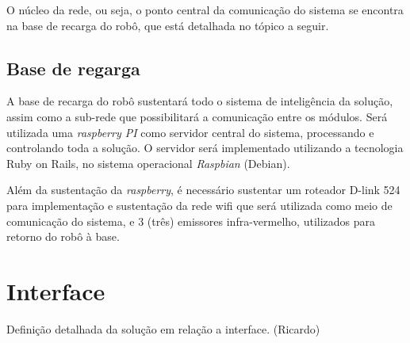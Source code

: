 	O núcleo da rede, ou seja, o ponto central da comunicação do sistema se encontra na base de recarga do robô, que está detalhada no tópico a seguir.

	\subsection{Base de regarga}

	A base de recarga do robô sustentará todo o sistema de inteligência da solução, assim como a sub-rede que possibilitará a comunicação entre os módulos. Será utilizada uma \textit{raspberry PI} como servidor central do sistema, processando e controlando toda a solução. O servidor será implementado utilizando a tecnologia Ruby on Rails, no sistema operacional \textit{Raspbian} (Debian).

	Além da sustentação da \textit{raspberry}, é necessário sustentar um roteador D-link 524 para implementação e sustentação da rede wifi que será utilizada como meio de comunicação do sistema, e 3 (três) emissores infra-vermelho, utilizados para retorno do robô à base.
	

\section{Interface} %
\label{sub:interface}
	Definição detalhada da solução em relação a interface. (Ricardo)
